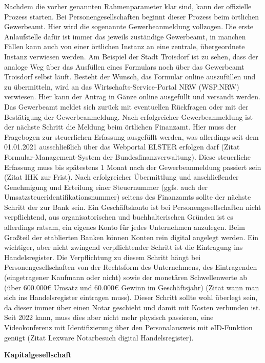 Nachdem die vorher genannten Rahmenparameter klar sind, kann der offizielle Prozess starten. Bei Personengesellschaften beginnt dieser Prozess beim örtlichen Gewerbeamt. Hier wird die sogenannte Gewerbeanmeldung vollzogen. Die erste Anlaufstelle dafür ist immer das jeweils zuständige Gewerbeamt, in manchen Fällen kann auch von einer örtlichen Instanz an eine zentrale, übergeordnete Instanz verwiesen werden. Am Beispiel der Stadt Troisdorf ist zu sehen, dass der analoge Weg über das Ausfüllen eines Formulars noch über das Gewerbeamt Troisdorf selbst läuft. Besteht der Wunsch, das Formular online auszufüllen und zu übermitteln, wird an das Wirtschafts-Service-Portal NRW (WSP.NRW) verwiesen. Hier kann der Antrag in Gänze online ausgefüllt und versandt werden. Das Gewerbeamt meldet sich zurück mit eventuellen Rückfragen oder mit der Bestätigung der Gewerbeanmeldung. Nach erfolgreicher Gewerbeanmeldung ist der nächste Schritt die Meldung beim örtlichen Finanzamt. Hier muss der Fragebogen zur steuerlichen Erfassung ausgefüllt werden, was allerdings seit dem 01.01.2021 ausschließlich über das Webportal ELSTER erfolgen darf (Zitat Formular-Management-System der Bundesfinanzverwaltung). Diese steuerliche Erfassung muss bis spätestens 1 Monat nach der Gewerbeanmeldung passiert sein (Zitat IHK zur Frist). Nach erfolgreicher Übermittlung und anschließender Genehmigung und Erteilung einer Steuernummer (ggfs. auch der Umsatzsteueridentifikationsnummer) seitens des Finanzamts sollte der nächste Schritt der zur Bank sein. Ein Geschäftskonto ist bei Personengesellschaften nicht verpflichtend, aus organisatorischen und buchhalterischen Gründen ist es allerdings ratsam, ein eigenes Konto für jedes Unternehmen anzulegen. Beim Großteil der etablierten Banken können Konten rein digital angelegt werden. Ein wichtiger, aber nicht zwingend verpflichtender Schritt ist die Eintragung ins Handelsregister. Die Verpflichtung zu diesem Schritt hängt bei Personengesellschaften von der Rechtsform des Unternehmens, des Eintragenden (eingetragener Kaufmann oder nicht) sowie der monetären Schwellenwerte ab (über 600.000€ Umsatz und 60.000€ Gewinn im Geschäftsjahr) (Zitat wann man sich ins Handelsregister eintragen muss). Dieser Schritt sollte wohl überlegt sein, da dieser immer über einen Notar geschieht und damit mit Kosten verbunden ist. Seit 2022 kann, muss dies aber nicht mehr physisch passieren, eine Videokonferenz mit Identifizierung über den Personalausweis mit eID-Funktion genügt (Zitat Lexware Notarbesuch digital Handelsregister). 

\textbf{Kapitalgesellschaft}

